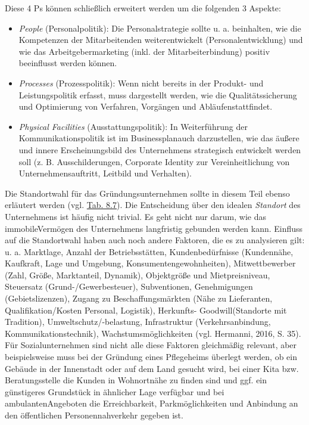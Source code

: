 \documentclass[
  letterpaper,
]{book}
\begin{document}
Diese 4 Ps können schließlich erweitert werden um die folgenden 3
Aspekte:

\begin{itemize}
\item
  \emph{People }(Personalpolitik): Die Personalstrategie sollte u. a.
  beinhalten, wie die Kompetenzen der Mitarbeitenden weiterentwickelt
  (Personalentwicklung) und wie das Arbeitgebermarketing (inkl. der
  Mitarbeiterbindung) positiv beeinflusst werden können.
\item
  \emph{Processes }(Prozesspolitik): Wenn nicht bereits in der Produkt-
  und Leistungspolitik erfasst, muss dargestellt werden, wie die
  Qualitätssicherung und Optimierung von Verfahren, Vorgängen und
  Abläufenstattfindet.
\item
  \emph{Physical Facilities }(Ausstattungspolitik): In Weiterführung der
  Kommunikationspolitik ist im Businessplanauch darzustellen, wie das
  äußere und innere Erscheinungsbild des Unternehmens strategisch
  entwickelt werden soll (z. B. Ausschilderungen, Corporate Identity zur
  Vereinheitlichung von Unternehmensauftritt, Leitbild und Verhalten).
\end{itemize}

Die Standortwahl für das Gründungsunternehmen sollte in diesem Teil
ebenso erläutert werden (vgl. \hyperref[figure87]{Tab. 8.7}). Die
Entscheidung über den idealen \emph{Standort }des Unternehmens ist
häufig nicht trivial. Es geht nicht nur darum, wie das immobileVermögen
des Unternehmens langfristig gebunden werden kann. Einfluss auf die
Standortwahl haben auch noch andere Faktoren, die es zu analysieren
gilt: u. a. Marktlage, Anzahl der Betriebsstätten, Kundenbedürfnisse
(Kundennähe, Kaufkraft, Lage und Umgebung, Konsumentengewohnheiten),
Mitwettbewerber (Zahl, Größe, Marktanteil, Dynamik), Objektgröße und
Mietpreisniveau, Steuersatz (Grund-/Gewerbesteuer), Subventionen,
Genehmigungen (Gebietslizenzen), Zugang zu Beschaffungsmärkten (Nähe zu
Lieferanten, Qualifikation/Kosten Personal, Logistik), Herkunfts-
Goodwill(Standorte mit Tradition), Umweltschutz/-belastung,
Infrastruktur (Verkehrsanbindung, Kommunikationstechnik),
Wachstumsmöglichkeiten (vgl. Hermanni, 2016, S. 35). Für
Sozialunternehmen sind nicht alle diese Faktoren gleichmäßig relevant,
aber beispielsweise muss bei der Gründung eines Pflegeheims überlegt
werden, ob ein Gebäude in der Innenstadt oder auf dem Land gesucht wird,
bei einer Kita bzw. Beratungsstelle die Kunden in Wohnortnähe zu finden
sind und ggf. ein günstigeres Grundstück in ähnlicher Lage verfügbar und
bei ambulantenAngeboten die Erreichbarkeit, Parkmöglichkeiten und
Anbindung an den öffentlichen Personennahverkehr gegeben ist.
\end{document}
